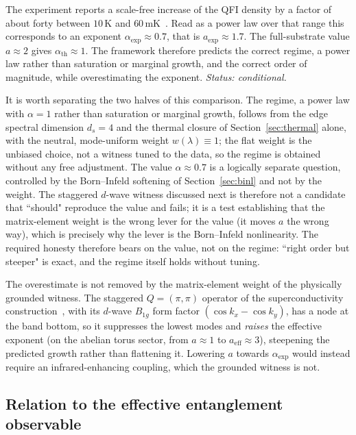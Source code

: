 \documentclass[11pt]{article}
\begin{document}
The experiment reports a scale-free increase of the QFI density by a factor of about forty between $10\,$K and
$60\,$mK~\cite{Mazza2026}.
Read as a power law over that range this corresponds to an exponent $\alpha_{\mathrm{exp}}\approx 0.7$, that is
$a_{\mathrm{exp}}\approx 1.7$.
The full-substrate value $a\approx 2$ gives $\alpha_{\mathrm{th}}\approx 1$.
The framework therefore predicts the correct regime, a power law rather than saturation or marginal growth, and
the correct order of magnitude, while overestimating the exponent.
\emph{Status: conditional.}

It is worth separating the two halves of this comparison.
The regime, a power law with $\alpha=1$ rather than saturation or marginal growth, follows from the edge spectral
dimension $d_s=4$ and the thermal closure of Section~\ref{sec:thermal} alone, with the neutral, mode-uniform weight
$w(\lambda)\equiv 1$; the flat weight is the unbiased choice, not a witness tuned to the data, so the regime is
obtained without any free adjustment.
The value $\alpha\approx 0.7$ is a logically separate question, controlled by the Born--Infeld softening of
Section~\ref{sec:binl} and not by the weight.
The staggered $d$-wave witness discussed next is therefore not a candidate that ``should" reproduce the value and
fails; it is a test establishing that the matrix-element weight is the wrong lever for the value (it moves $a$ the
wrong way), which is precisely why the lever is the Born--Infeld nonlinearity.
The required honesty therefore bears on the value, not on the regime: ``right order but steeper" is exact, and the
regime itself holds without tuning.

The overestimate is not removed by the matrix-element weight of the physically grounded witness.
The staggered $Q=(\pi,\pi)$ operator of the superconductivity construction~\cite{Beau2026g}, with its $d$-wave
$B_{1g}$ form factor $(\cos k_x-\cos k_y)$, has a node at the band bottom, so it suppresses the lowest modes and
\emph{raises} the effective exponent (on the abelian torus sector, from $a\approx 1$ to $a_{\mathrm{eff}}\approx 3$),
steepening the predicted growth rather than flattening it.
Lowering $a$ towards $\alpha_{\mathrm{exp}}$ would instead require an infrared-enhancing coupling, which the
grounded witness is not.

\subsection{Relation to the effective entanglement observable}
\end{document}
